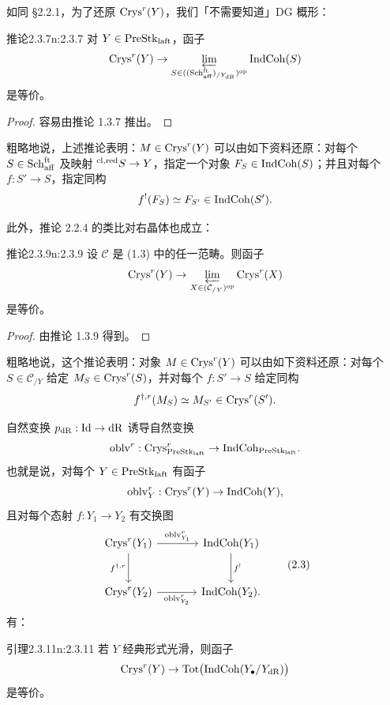 如同 §2.2.1，为了还原 $\mathrm{Crys}^r(Y)$，我们「不需要知道」DG 概形：

\begin{othm}{推论}{2.3.7}{n:2.3.7}
对 $Y\in\mathrm{PreStk}_{\mathrm{laft}}$，函子
\[
\mathrm{Crys}^r(Y)\to\varprojlim_{S\in((\mathrm{Sch}_{\mathrm{aff}}^{\mathrm{ft}})_{/Y_{\mathrm{dR}}})^{\mathrm{op}}}\mathrm{IndCoh}(S)
\]
是等价。
\end{othm}

\begin{proof}
容易由推论 1.3.7 推出。
\end{proof}

粗略地说，上述推论表明：$M\in\mathrm{Crys}^r(Y)$ 可以由如下资料还原：对每个 $S\in\mathrm{Sch}_{\mathrm{aff}}^{\mathrm{ft}}$ 及映射 $^{\mathrm{cl,red}} S\to Y$，指定一个对象 $F_S\in\mathrm{IndCoh}(S)$；并且对每个 $f:S'\to S$，指定同构
\[
f^!(F_S)\simeq F_{S'}\in\mathrm{IndCoh}(S').
\]

此外，推论 2.2.4 的类比对右晶体也成立：

\begin{othm}{推论}{2.3.9}{n:2.3.9}
设 $\mathcal{C}$ 是 (1.3) 中的任一范畴。则函子
\[
\mathrm{Crys}^r(Y)\to\varprojlim_{X\in(\mathcal{C}_{/Y})^{\mathrm{op}}}\mathrm{Crys}^r(X)
\]
是等价。
\end{othm}

\begin{proof}
由推论 1.3.9 得到。
\end{proof}

粗略地说，这个推论表明：对象 $M\in\mathrm{Crys}^r(Y)$ 可以由如下资料还原：对每个 $S\in\mathcal{C}_{/Y}$ 给定 $M_S\in\mathrm{Crys}^r(S)$，并对每个 $f:S'\to S$ 给定同构
\[
f^{\dagger,r}(M_S)\simeq M_{S'}\in\mathrm{Crys}^r(S').
\]

自然变换 $p_{\mathrm{dR}}:\mathrm{Id}\to\mathrm{dR}$ 诱导自然变换
\[
\mathrm{oblv}^r:\mathrm{Crys}^r_{\mathrm{PreStk}_{\mathrm{laft}}}\to\mathrm{IndCoh}_{\mathrm{PreStk}_{\mathrm{laft}}}.
\]
也就是说，对每个 $Y\in\mathrm{PreStk}_{\mathrm{laft}}$ 有函子
\[
\mathrm{oblv}^r_Y:\mathrm{Crys}^r(Y)\to\mathrm{IndCoh}(Y),
\]
且对每个态射 $f:Y_1\to Y_2$ 有交换图
\begin{equation}
\begin{tikzcd}[column sep=large, row sep=large]
 \Crys^r(Y_1) \arrow[r, "\oblv^r_{Y_1}"] \arrow[d, "f^{\dagger,r}"'] & \IndCoh(Y_1) \arrow[d, "f^!"] \\
 \Crys^r(Y_2) \arrow[r, "\oblv^r_{Y_2}"'] & \IndCoh(Y_2).
\end{tikzcd}\tag{2.3}
\end{equation}
有：

\begin{othm}{引理}{2.3.11}{n:2.3.11}
若 $Y$ 经典形式光滑，则函子
\[
\mathrm{Crys}^r(Y)\to\mathrm{Tot}\big(\mathrm{IndCoh}(Y_\bullet/Y_{\mathrm{dR}})\big)
\]
是等价。
\end{othm}

